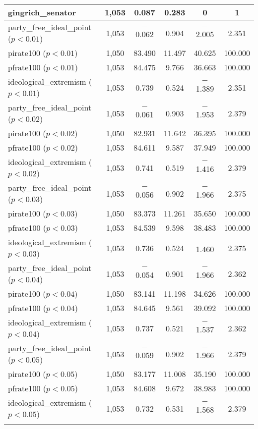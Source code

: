 \documentclass[12pt]{article}
\begin{document}
\begin{table}[ht]
\begin{tabular}{@{\extracolsep{5pt}}lccccc}
		gingrich\_senator & 1,053 & 0.087 & 0.283 & 0 & 1 \\ 
		\hline
		party\_free\_ideal\_point ($ p < 0.01 $) & 1,053 & $-$0.062 & 0.904 & $-$2.005 & 2.351 \\ 
		pirate100 ($ p < 0.01 $) & 1,050 & 83.490 & 11.497 & 40.625 & 100.000 \\ 
		pfrate100 ($ p < 0.01 $) & 1,053 & 84.475 & 9.766 & 36.663 & 100.000 \\ 
		ideological\_extremism ($ p < 0.01 $) & 1,053 & 0.739 & 0.524 & $-$1.389 & 2.351 \\ 
		\hline
		party\_free\_ideal\_point ($ p < 0.02 $) & 1,053 & $-$0.061 & 0.903 & $-$1.953 & 2.379 \\ 
		pirate100 ($ p < 0.02 $) & 1,050 & 82.931 & 11.642 & 36.395 & 100.000 \\ 
		pfrate100 ($ p < 0.02 $) & 1,053 & 84.611 & 9.587 & 37.949 & 100.000 \\ 
		ideological\_extremism ($ p < 0.02 $) & 1,053 & 0.741 & 0.519 & $-$1.416 & 2.379 \\ 
		\hline
		party\_free\_ideal\_point ($ p < 0.03 $) & 1,053 & $-$0.056 & 0.902 & $-$1.966 & 2.375 \\ 
		pirate100 ($ p < 0.03 $) & 1,050 & 83.373 & 11.261 & 35.650 & 100.000 \\ 
		pfrate100 ($ p < 0.03 $) & 1,053 & 84.539 & 9.598 & 38.483 & 100.000 \\ 
		ideological\_extremism ($ p < 0.03 $) & 1,053 & 0.736 & 0.524 & $-$1.460 & 2.375 \\ 
		\hline
		party\_free\_ideal\_point ($ p < 0.04 $) & 1,053 & $-$0.054 & 0.901 & $-$1.966 & 2.362 \\ 
		pirate100 ($ p < 0.04 $) & 1,050 & 83.141 & 11.198 & 34.626 & 100.000 \\ 
		pfrate100 ($ p < 0.04 $) & 1,053 & 84.645 & 9.561 & 39.092 & 100.000 \\ 
		ideological\_extremism ($ p < 0.04 $) & 1,053 & 0.737 & 0.521 & $-$1.537 & 2.362 \\ 
		\hline
		party\_free\_ideal\_point ($ p < 0.05 $) & 1,053 & $-$0.059 & 0.902 & $-$1.966 & 2.379 \\ 
		pirate100 ($ p < 0.05 $) & 1,050 & 83.177 & 11.008 & 35.190 & 100.000 \\ 
		pfrate100 ($ p < 0.05 $) & 1,053 & 84.608 & 9.672 & 38.983 & 100.000 \\ 
		ideological\_extremism ($ p < 0.05 $) & 1,053 & 0.732 & 0.531 & $-$1.568 & 2.379 \\ 
		\hline \\[-1.8ex] 
	\end{tabular} 
\end{table} 
\end{document}
